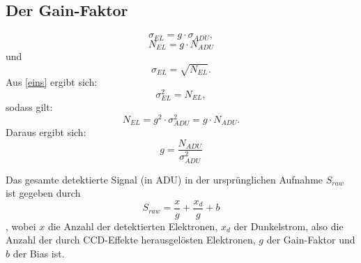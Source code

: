 \subsection{Der Gain-Faktor}
\begin{equation}
\sigma_{EL} = g \cdot \sigma_{ADU}, 
\label{eins}
\end{equation}
\begin{equation}
N_{EL} = g \cdot N_{ADU}
\end{equation}
und 
\begin{equation}
\sigma_{EL} = \sqrt{N_{EL}}. 
\end{equation}
Aus \eqref{eins} ergibt sich: 
\begin{equation}
\sigma_{EL}^2 = N_{EL}, 
\end{equation}
sodass gilt: 
\begin{equation}
N_{EL} = g^2 \cdot \sigma_{ADU}^2 = g \cdot N_{ADU}. 
\end{equation}
Daraus ergibt sich: 
\begin{equation}
g = \frac{N_{ADU}}{\sigma_{ADU}^2}
\end{equation}

Das gesamte detektierte Signal (in ADU) in der ursprünglichen Aufnahme $S_{raw}$ ist gegeben durch
\begin{equation}
S_{raw} = \frac{x}{g} + \frac{x_d}{g} + b
\end{equation}, 
wobei $x$ die Anzahl der detektierten Elektronen, $x_d$ der Dunkelstrom, also die Anzahl der durch CCD-Effekte herausgelösten Elektronen, $g$ der Gain-Faktor und $b$ der Bias ist.\\

